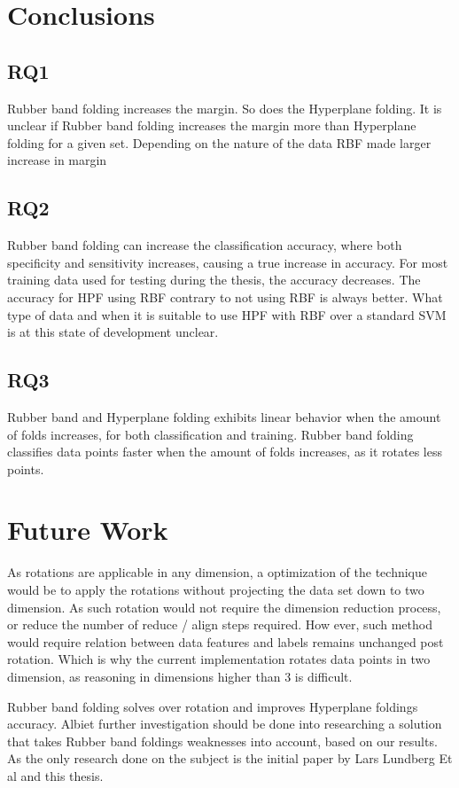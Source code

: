 \documentclass[a4paper,twoside]{bth}
\begin{document}
\chapter{Conclusions}
\section{RQ1}
Rubber band folding increases the margin. So does the Hyperplane folding. It is unclear if Rubber band folding increases the margin more than Hyperplane folding for a given set. Depending on the nature of the data RBF made larger increase in margin
\section{RQ2}
Rubber band folding can increase the classification accuracy, where both specificity and sensitivity increases, causing a true increase in accuracy. For most training data used for testing during the thesis, the accuracy decreases. The accuracy for HPF using RBF contrary to not using RBF is always better. What type of data and when it is suitable to use HPF with RBF over a standard SVM is at this state of development unclear. 

\section{RQ3}
Rubber band and Hyperplane folding exhibits linear behavior when the amount of folds increases, for both classification and training. Rubber band folding classifies data points faster when the amount of folds increases, as it rotates less points. 

\chapter{Future Work}
\par As rotations are applicable in any dimension, a optimization of the technique would be to apply the rotations without projecting the data set down to two dimension. As such rotation would not require the dimension reduction process, or reduce the number of reduce  / align steps required. How ever, such method would require relation between data features and labels remains unchanged post rotation. Which is why the current implementation rotates data points in two dimension, as reasoning in dimensions higher than 3 is difficult.

\par Rubber band folding solves over rotation and improves Hyperplane foldings accuracy. Albiet further investigation should be done into researching a solution that takes Rubber band foldings weaknesses into account, based on our results. As the only research done on the subject is the initial paper by Lars Lundberg Et al and this thesis. 
\end{document}
